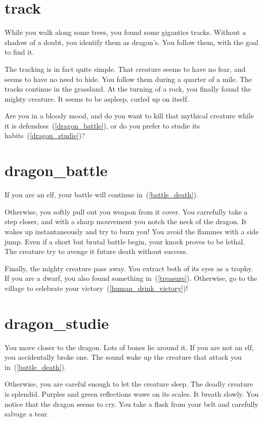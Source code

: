 \section{track}

While you walk along some trees, you found some gigantics tracks. Without a
shadow of a doubt, you identify them as dragon's. You follow them, with
the goal to find it.

The tracking is in fact quite simple. That creature seems to have no fear, and
seems to have no need to hide. You follow them during a quarter of a mile. The
tracks continue in the grassland. At the turning of a rock, you finally found
the mighty creature. It seems to be aspleep, curled up on itself.

Are you in a bloody mood, and do you want to kill that mythical creature while it
is defensless~(\ref{dragon_battle}), or do you prefer to studie its
habits~(\ref{dragon_studie})?

\section{dragon_battle}

If you are an elf, your battle will continue in~(\ref{battle_death}).

\medbreak

Otherwise, you softly pull out you weapon from it cover. You carrefully take a
step closer, and with a sharp mouvement you notch the neck of the dragon. It wakes
up instantaneously and try to burn you! You avoid the flammes with a side jump.
Even if a short but brutal battle begin, your knock proves to be lethal. The
creature try to avenge it future death without success.

Finally, the mighty creature pass away. You extract both of its eyes as a
trophy. If you are a dwarf, you also found something in~(\ref{treasure}).
Otherwise, go to the village to celebrate your
victory~(\ref{human_drink_victory})!

\section{dragon_studie}

You move closer to the dragon. Lots of bones lie around it. If you are not an
elf, you accidentally broke one. The sound wake up the creature that attack you
in~(\ref{battle_death}).

\medbreak

Otherwise, you are careful enough to let the creature sleep. The deadly
creature is splendid. Purples and green reflections wawe on its scales. It
breath slowly. You notice that the dragon seems to cry. You take a flask from
your belt and carefully salvage a tear.

